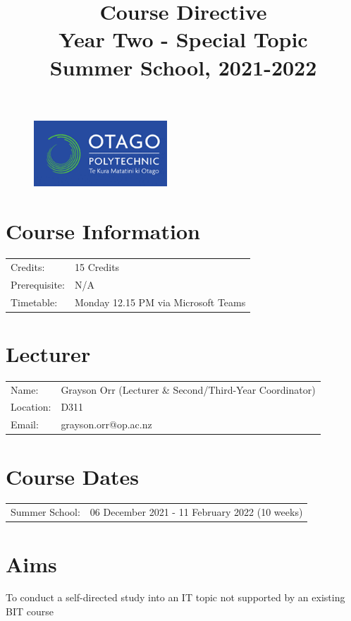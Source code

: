 \documentclass{article}
\author{}
\begin{document}
 

\begin{figure}
	\includegraphics[width=50mm]{../../resources/img/logo.png}
\end{figure} 

\title{Course Directive\\Year Two - Special Topic\\Summer School, 2021-2022}
\date{}
\maketitle  

\section*{Course Information}
\begin{tabular}{ll}
	Credits:            & 15 Credits                             \\
	Prerequisite:       & N/A                  \\
	Timetable:  & Monday 12.15 PM via Microsoft Teams       
\end{tabular} 

\section*{Lecturer}
\begin{tabular}{ll}
	Name: & Grayson Orr (Lecturer \& Second/Third-Year Coordinator) \\
	Location: & D311                   \\
	Email: & grayson.orr@op.ac.nz   \\
\end{tabular}

\section*{Course Dates}
\begin{tabular}{ll}
	Summer School: & 06 December 2021 - 11 February 2022 (10 weeks)  
\end{tabular}

\section*{Aims}
To conduct a self-directed study into an IT topic not supported by an existing BIT course
\end{document}

